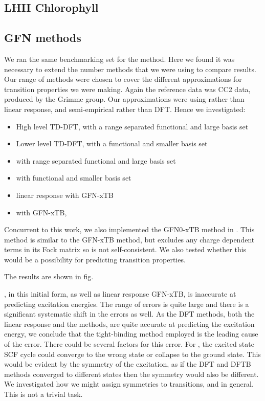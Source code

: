 \subsection{LHII Chlorophyll}
\label{subsec:dscf_chl_tests}

\subsection{GFN methods}
\label{subsec:dscf_gfn_tests}
We ran the same benchmarking set for the \dxtb method. Here we found it was 
necessary to extend the number methods that we were using to compare results.
Our range of methods were chosen to cover the different approximations for
transition properties we were making. Again the reference data was CC2 data, 
produced by the Grimme group. Our approximations were using \dscf rather than
linear response, and semi-empirical rather than DFT. Hence we investigated:
\begin{itemize}
    \item High level TD-DFT, with a range separated functional and large basis set
    \item Lower level TD-DFT, with a functional and smaller basis set
    \item \dscf with range separated functional and large basis set
    \item \dscf with functional and smaller basis set
    \item linear response with GFN-xTB
    \item \dscf with GFN-xTB, \dxtb
\end{itemize}

Concurrent to this work, we also implemented the GFN0-xTB method in .
This method is similar to the GFN-xTB method, but excludes any charge dependent
terms in its Fock matrix so is not self-consistent. We also tested whether this
would be a possibility for predicting transition properties.

The results are shown in fig.

\dxtb, in this initial form, as well as linear response GFN-xTB, is inaccurate 
at predicting excitation energies. The range of errors is quite large and there 
is a significant systematic shift in the errors as well. As the DFT methods, 
both the linear response and the \dscf methods, are quite accurate at predicting
the excitation energy, we conclude that the tight-binding method employed is the
leading cause of the error. 
There could be several factors for this error. For \dxtb, the excited state SCF 
cycle could converge to the wrong state or collapse to the ground state. This
would be evident by the symmetry of the excitation, as if the DFT and DFTB methods
converged to different states then the symmetry would also be different. We 
investigated how we might assign symmetries to \dxtb transitions, and \dscf in 
general. This is not a trivial task. 

